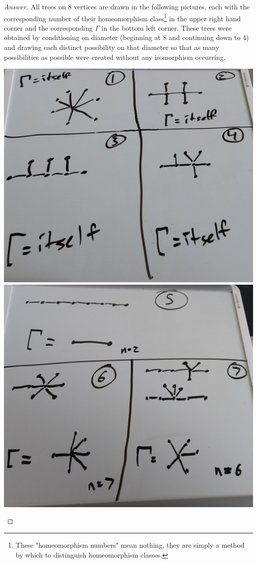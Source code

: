 \documentclass[12pt]{article}
\begin{document}
\begin{proof}[Answer]
All trees on 8 vertices are drawn in the following pictures, each with the corresponding number of their homeomorphism class\footnote{These "homeomorphism numbers" mean nothing, they are simply a method by which to distinguish homeomorphism classes.} in the upper right hand corner and the corresponding $\Gamma$ in the bottom left corner. These trees were obtained by conditioning on diameter (beginning at 8 and continuing down to 4) and drawing each distinct possibility on that diameter so that as many possibilities as possible were created without any isomorphism occurring. \\
\begin{center}
\includegraphics[scale=0.07]{1_4.jpg}
\hspace{0.05in}
\includegraphics[scale=0.07]{5_7.jpg}

\end{center}
\end{proof}
\end{document}
